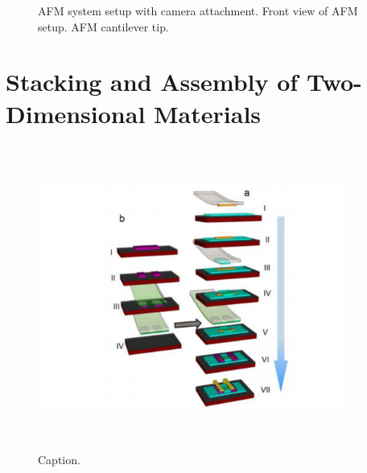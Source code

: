 \begin{figure}[ht]
    \centering  
    \qquad
    \caption[Diagram of atomic force microscope setup and cantilever]{
        \acs{AFM} system setup with camera attachment. 
        \protect{} Front view of \acs{AFM} setup. 
        \protect{} AFM cantilever tip.
    }
\end{figure}

\section{Stacking and Assembly of Two-Dimensional Materials}\label{sec:transfer}

\begin{figure}[ht]
    \centering
    \includegraphics[height=10cm,width=10cm]{device_fab_diagram}
    \caption[Schematic and process flow of device fabrication using transfer techniques]
    {
        Caption.
    }
    \label{fig:device_fab_diagram}
\end{figure}

